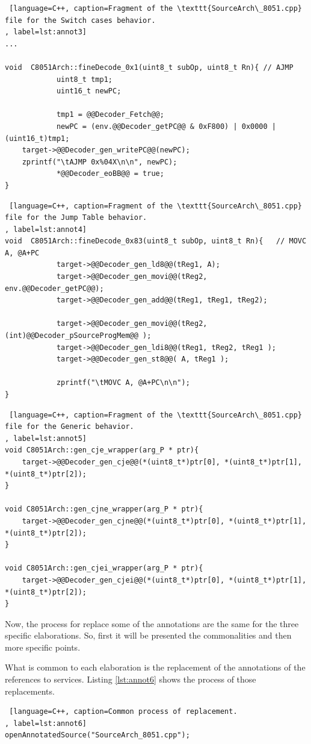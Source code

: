 \documentclass[12pt]{article}
\begin{document}
{\begin{lstlisting} [language=C++, caption=Fragment of the \texttt{SourceArch\_8051.cpp} file for the Switch cases behavior.
, label=lst:annot3]
...

void  C8051Arch::fineDecode_0x1(uint8_t subOp, uint8_t Rn){	// AJMP
			uint8_t tmp1;
			uint16_t newPC; 

			tmp1 = @@Decoder_Fetch@@;
			newPC = (env.@@Decoder_getPC@@ & 0xF800) | 0x0000 | (uint16_t)tmp1; 
  	target->@@Decoder_gen_writePC@@(newPC);	
  	zprintf("\tAJMP 0x%04X\n\n", newPC);
			*@@Decoder_eoBB@@ = true;		
}
\end{lstlisting}

\begin{lstlisting} [language=C++, caption=Fragment of the \texttt{SourceArch\_8051.cpp} file for the Jump Table behavior.
, label=lst:annot4]
void  C8051Arch::fineDecode_0x83(uint8_t subOp, uint8_t Rn){   // MOVC A, @A+PC
			target->@@Decoder_gen_ld8@@(tReg1, A);
			target->@@Decoder_gen_movi@@(tReg2, env.@@Decoder_getPC@@);
			target->@@Decoder_gen_add@@(tReg1, tReg1, tReg2);
		
			target->@@Decoder_gen_movi@@(tReg2, (int)@@Decoder_pSourceProgMem@@ );
			target->@@Decoder_gen_ldi8@@(tReg1, tReg2, tReg1 );
			target->@@Decoder_gen_st8@@( A, tReg1 );

			zprintf("\tMOVC A, @A+PC\n\n");
}
\end{lstlisting}

\begin{lstlisting} [language=C++, caption=Fragment of the \texttt{SourceArch\_8051.cpp} file for the Generic behavior.
, label=lst:annot5]
void C8051Arch::gen_cje_wrapper(arg_P * ptr){ 
    target->@@Decoder_gen_cje@@(*(uint8_t*)ptr[0], *(uint8_t*)ptr[1], *(uint8_t*)ptr[2]);    
}

void C8051Arch::gen_cjne_wrapper(arg_P * ptr){ 
    target->@@Decoder_gen_cjne@@(*(uint8_t*)ptr[0], *(uint8_t*)ptr[1], *(uint8_t*)ptr[2]);      
}

void C8051Arch::gen_cjei_wrapper(arg_P * ptr){
    target->@@Decoder_gen_cjei@@(*(uint8_t*)ptr[0], *(uint8_t*)ptr[1], *(uint8_t*)ptr[2]);    
}
\end{lstlisting}

Now, the process for replace some of the annotations are the same for the three specific elaborations. So, first it will be presented the commonalities and then more specific points. 

What is common to each elaboration is the replacement of the annotations of the references to services. Listing \ref{lst:annot6} shows the process of those replacements.

\newpage
\begin{lstlisting} [language=C++, caption=Common process of replacement.
, label=lst:annot6]
openAnnotatedSource("SourceArch_8051.cpp");   
		

\end{lstlisting}}
\end{document}
